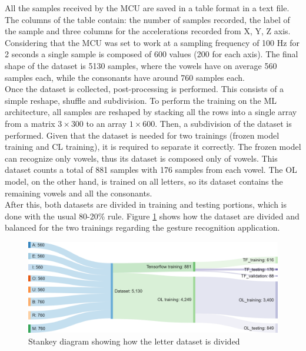 \documentclass[12pt]{report}
\begin{document}
All the samples received by the MCU are saved in a table format in a text file. The columns of the table contain: the number of samples recorded, the label of the sample and three columns for the accelerations recorded from X, Y, Z axis. Considering that the MCU was set to work at a sampling frequency of 100 Hz for 2 seconds a single sample is composed of 600 values (200 for each axis). 
The final shape of the dataset is 5130 samples, where the vowels have on average 560 samples each, while the consonants have around 760 samples each. \\
Once the dataset is collected, post-processing is performed. This consists of a simple reshape, shuffle and subdivision. To perform the training on the ML architecture, all samples are reshaped by stacking all the rows into a single array from a matrix $3 \times 300$ to an array $1 \times 600$. Then, a subdivision of the dataset is performed. Given that the dataset is needed for two trainings (frozen model training and CL training), it is required to separate it correctly. The frozen model can recognize only vowels, thus its dataset is composed only of vowels. This dataset counts a total of 881 samples with 176 samples from each vowel. The OL model, on the other hand, is trained on all letters, so its dataset contains the remaining vowels and all the consonants. \\
After this, both datasets are divided in training and testing portions, which is done with the usual 80-20\% rule. Figure \ref{fig:flow_dataset_letters} shows how the dataset are divided and balanced for the two trainings regarding the gesture recognition application.

\begin{figure}[h!]
    \centering
    \includegraphics[width=120mm]{Figures/Chapter4/flow_dataset_letters.png} 
    \caption{Stankey diagram showing how the letter dataset is divided}
    \label{fig:flow_dataset_letters}    
\end{figure}
\end{document}
